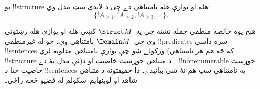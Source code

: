 \documentclass[../../../include/open-logic-section]{subfiles}
\begin{document}
\begin{prop}
يو !!{structure} هله او يوازې هله نامتناهي دے چې د لاندې سټ مدل وي:
\[
\{!A_{\ge 1}, !A_{\ge 2}, !A_{\ge 3}, \dots \}.
\]
\end{prop}

هېڅ يوه خالصه منطقي جمله نشته چې په~$\Struct M$ کښې هله او يوازې
هله رښتونې وي چې~$\Domain M$ نامتناهي وي۔ خو له غيرمنطقي
!!{predicate}s سره داسې !!{sentence}s ورکولے شو چې يوازې نامتناهي
مدلونه لري (که څه هم هر نامتناهي !!{structure} ئې مدل نۀ دے)۔ د
متناهي جوړښت خاصيت او د !!{nonenumerable} جوړښت خاصيت حتا د
!!{sentence}s په نامتناهي سټ هم نۀ شي بيانېدے۔ دا حقيقتونه د
متناهي شاهد او لوېنهايم--سکولم له قضيو څخه راځي۔
\end{document}
